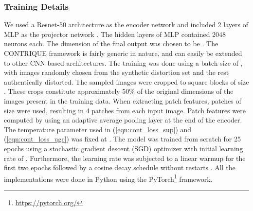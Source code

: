 \documentclass[journal]{IEEEtran}
\begin{document}
\subsubsection*{\textbf{Training Details}}
We used a Resnet-50 \cite{he2016deep} architecture as the encoder network  and included 2 layers of MLP as the projector network . The hidden layers of MLP contained 2048 neurons each. The dimension of the final output  was chosen to be . The CONTRIQUE framework is fairly generic in nature, and can easily be extended to other CNN based architectures. The training was done using a batch size of , with  images randomly chosen from the synthetic distortion set and the rest authentically distorted. The sampled images were cropped to square blocks of size . These crops constitute approximately 50\% of the original dimensions of the images present in the training data. When extracting patch features, patches of size  were used, resulting in 4 patches from each input image. Patch features were computed by using an adaptive average pooling layer at the end of the encoder. The temperature parameter used in (\ref{eqn:cont_loss_sup}) and (\ref{eqn:cont_loss_ugc}) was fixed at . The model was trained from scratch for 25 epochs using a stochastic gradient descent (SGD) optimizer with initial learning rate of . Furthermore, the learning rate was subjected to a linear warmup for the first two epochs followed by a cosine decay schedule without restarts \cite{loshchilov2016sgdr}. All the implementations were done in Python using the PyTorch\footnote{\url{https://pytorch.org/}} framework.\\
 
\end{document}
